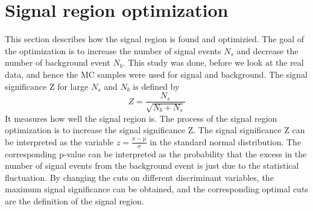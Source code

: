 \section{Signal region optimization}
\label{sec:signal_region_optimization}
This section describes how the signal region is found and optimizied.
The goal of the optimization is to increase the number of signal events $N_s$ and decrease the number of background event $N_b$.
This study was done, before we look at the real data, and hence the MC samples were used for signal and background.
The signal significance Z for large $N_s$ and $N_b$ is defined by
\begin{equation}
Z = \frac{N_s}{\sqrt{N_b + N_s}}
\label{equ:simple_significance}
\end{equation}
It measures how well the signal region is.
The process of the signal region optimization is to increase the signal significance Z.
The signal significance Z can be interpreted as the variable $z = \frac{x-\mu}{\sigma}$ in the standard normal distribution.
The corresponding p-value can be interpreted as the probability that the excess in the number of signal events from the background event is just due to the statistical fluctuation.
By changing the cuts on different discriminant variables, the maximum signal significance can be obtained, and the corresponding optimal cuts are the definition of the signal region.

